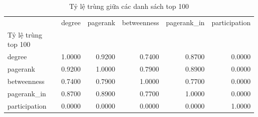 \begin{table}[htbp]
\caption{Tỷ lệ trùng giữa các danh sách top 100}
\label{tab:rq3_overlap}
\begin{tabular}{lrrrrr}
\toprule
 & degree & pagerank & betweenness & pagerank\_in & participation \\
Tỷ lệ trùng top 100 &  &  &  &  &  \\
\midrule
degree & 1.0000 & 0.9200 & 0.7400 & 0.8700 & 0.0000 \\
pagerank & 0.9200 & 1.0000 & 0.7900 & 0.8900 & 0.0000 \\
betweenness & 0.7400 & 0.7900 & 1.0000 & 0.7700 & 0.0000 \\
pagerank\_in & 0.8700 & 0.8900 & 0.7700 & 1.0000 & 0.0000 \\
participation & 0.0000 & 0.0000 & 0.0000 & 0.0000 & 1.0000 \\
\bottomrule
\end{tabular}
\end{table}
